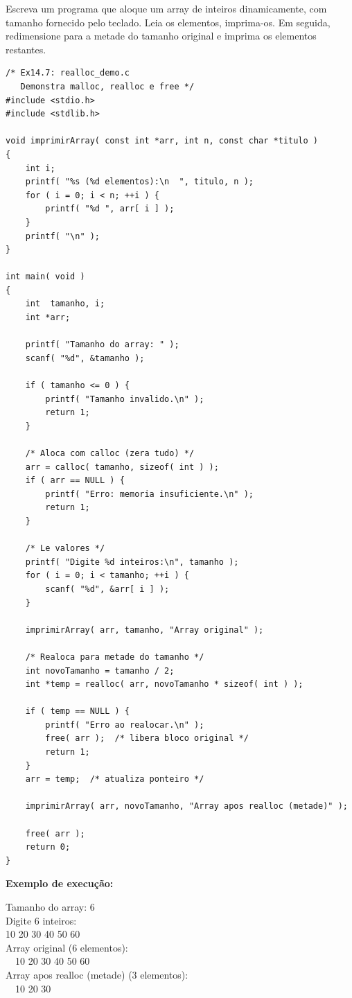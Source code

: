 \documentclass[12pt,a4paper]{article}
\begin{document}
\begin{enunciadoBox}[Enunciado 14.7]
Escreva um programa que aloque um array de inteiros dinamicamente, com tamanho
fornecido pelo teclado. Leia os elementos, imprima-os. Em seguida, redimensione
para a metade do tamanho original e imprima os elementos restantes.
\end{enunciadoBox}

\begin{respostabox}
\begin{lstlisting}
/* Ex14.7: realloc_demo.c
   Demonstra malloc, realloc e free */
#include <stdio.h>
#include <stdlib.h>

void imprimirArray( const int *arr, int n, const char *titulo )
{
    int i;
    printf( "%s (%d elementos):\n  ", titulo, n );
    for ( i = 0; i < n; ++i ) {
        printf( "%d ", arr[ i ] );
    }
    printf( "\n" );
}

int main( void )
{
    int  tamanho, i;
    int *arr;

    printf( "Tamanho do array: " );
    scanf( "%d", &tamanho );

    if ( tamanho <= 0 ) {
        printf( "Tamanho invalido.\n" );
        return 1;
    }

    /* Aloca com calloc (zera tudo) */
    arr = calloc( tamanho, sizeof( int ) );
    if ( arr == NULL ) {
        printf( "Erro: memoria insuficiente.\n" );
        return 1;
    }

    /* Le valores */
    printf( "Digite %d inteiros:\n", tamanho );
    for ( i = 0; i < tamanho; ++i ) {
        scanf( "%d", &arr[ i ] );
    }

    imprimirArray( arr, tamanho, "Array original" );

    /* Realoca para metade do tamanho */
    int novoTamanho = tamanho / 2;
    int *temp = realloc( arr, novoTamanho * sizeof( int ) );

    if ( temp == NULL ) {
        printf( "Erro ao realocar.\n" );
        free( arr );  /* libera bloco original */
        return 1;
    }
    arr = temp;  /* atualiza ponteiro */

    imprimirArray( arr, novoTamanho, "Array apos realloc (metade)" );

    free( arr );
    return 0;
}
\end{lstlisting}

\textbf{Exemplo de execução:}
\begin{saida}
Tamanho do array: 6\\
Digite 6 inteiros:\\
10 20 30 40 50 60\\
Array original (6 elementos):\\
\ \ 10 20 30 40 50 60\\
Array apos realloc (metade) (3 elementos):\\
\ \ 10 20 30
\end{saida}
\end{respostabox}
\end{document}
